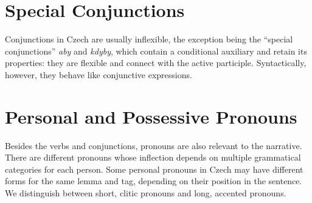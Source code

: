 \section{Special Conjunctions}

Conjunctions in Czech are usually inflexible, the exception being the ``special conjunctions'' \emph{aby} and \emph{kdyby}, which contain a conditional auxiliary and retain its properties: they are flexible and connect with the active participle. Syntactically, however, they behave like conjunctive expressions. \cite{Prejzova2013thesis}

\section{Personal and Possessive Pronouns}

Besides the verbs and conjunctions, pronouns are also relevant to the narrative. There are different pronouns whose inflection depends on multiple grammatical categories for each person. Some personal pronouns in Czech may have different forms for the same lemma and tag, depending on their position in the sentence. We distinguish between short, clitic pronouns and long, accented pronouns.

